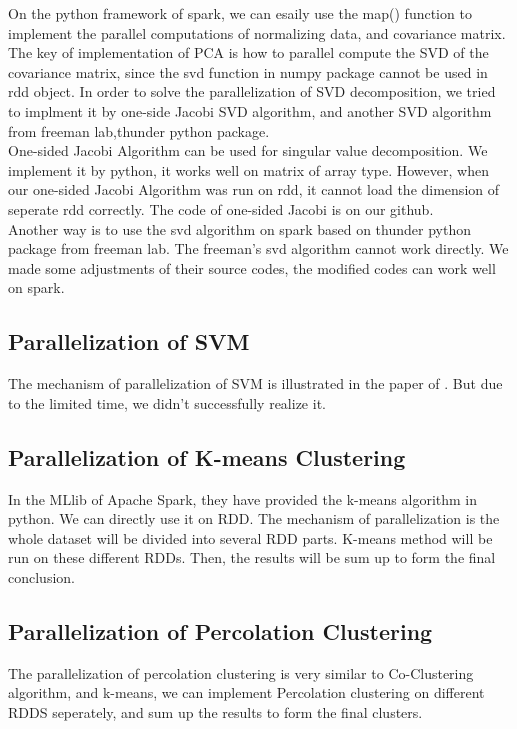 \documentclass[a4paper]{article}
\begin{document}
On the python framework of spark, we can esaily use the map() function to implement the parallel computations of normalizing data, and covariance matrix. The key of implementation of PCA is how to parallel compute the SVD of the covariance matrix, since the svd function in numpy package cannot be used in rdd object. In order to solve the parallelization of SVD decomposition, we tried to implment it by one-side Jacobi SVD algorithm, and another SVD algorithm from freeman lab,thunder python package.\\
One-sided Jacobi Algorithm can be used for singular value decomposition\cite{Jacobi}. We implement it by python, it works well on matrix of array type. However, when our one-sided Jacobi Algorithm was run on rdd, it cannot load the dimension of seperate rdd correctly. The code of one-sided Jacobi is on our github. \\
Another way is to use the svd algorithm on spark based on thunder python package from freeman lab. The freeman's svd algorithm cannot work directly. We made some adjustments of their source codes, the modified codes can work well on spark. 

\subsection{Parallelization of SVM}

The mechanism of parallelization of SVM is illustrated in the paper of \cite{}. But due to the limited time, we didn't successfully realize it.

\subsection{Parallelization of K-means Clustering}

In the MLlib of Apache Spark, they have provided the k-means algorithm in python. We can directly use it on RDD. The mechanism of parallelization is the whole dataset will be divided into several RDD parts. K-means method will be run on these different RDDs. Then, the results will be sum up to form the final conclusion.

\subsection{Parallelization of Percolation Clustering}

The parallelization of percolation clustering is very similar to Co-Clustering algorithm, and k-means, we can implement Percolation clustering on different RDDS seperately, and sum up the results to form the final clusters. 
\end{document}

